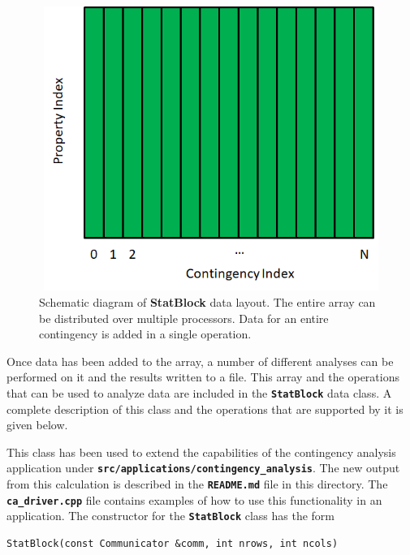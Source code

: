 \documentclass[12pt]{report} %
\begin{document}
\begin{figure}
  \centering
    \includegraphics*[width=4.81in, height=3.65in, keepaspectratio=true]{Fig13}
  \caption{Schematic diagram of \textbf{StatBlock} data layout. The entire array can be distributed over multiple processors. Data for an entire contingency is added in a single operation.}
  \label{fig:fig-13}
\end{figure}



Once data has been added to the array, a number of different analyses can be performed on it and the results written to a file. This array and the operations that can be used to analyze data are included in the \texttt{\textbf{StatBlock}} data class. A complete description of this class and the operations that are supported by it is given below.

This class has been used to extend the capabilities of the contingency analysis application under \texttt{\textbf{src/applications/contingency\_analysis}}. The new output from this calculation is described in the \texttt{\textbf{README.md}} file in this directory. The \texttt{\textbf{ca\_driver.cpp}} file contains examples of how to use this functionality in an application.
The constructor for the \texttt{\textbf{StatBlock}} class has the form

{
\color{red}
\begin{Verbatim}[fontseries=b]
StatBlock(const Communicator &comm, int nrows, int ncols)
\end{Verbatim}
}
\end{document}
